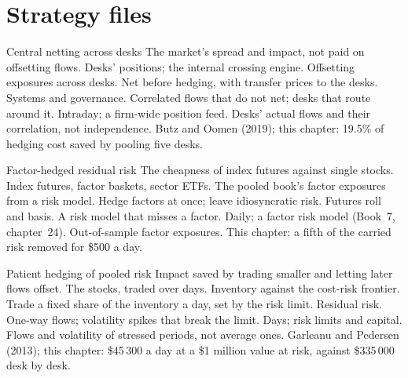 \section{Strategy files}

\begin{strategyfile}{Central netting across desks}\label{strat:s2:the-central-risk-book:netting}
 The market's spread and impact, not paid on offsetting flows.
 Desks' positions; the internal crossing engine.
 Offsetting exposures across desks.
 Net before hedging, with transfer prices to the desks.
 Systems and governance.
 Correlated flows that do not net; desks that route around it.
 Intraday; a firm-wide position feed.
 Desks' actual flows and their correlation, not independence.
 Butz and Oomen (2019); this chapter: 19.5\% of hedging cost saved by pooling five desks.
\end{strategyfile}

\begin{strategyfile}{Factor-hedged residual risk}\label{strat:s2:the-central-risk-book:factor}
 The cheapness of index futures against single stocks.
 Index futures, factor baskets, sector ETFs.
 The pooled book's factor exposures from a risk model.
 Hedge factors at once; leave idiosyncratic risk.
 Futures roll and basis.
 A risk model that misses a factor.
 Daily; a factor risk model (Book~7, chapter~24).
 Out-of-sample factor exposures.
 This chapter: a fifth of the carried risk removed for \$500 a day.
\end{strategyfile}

\begin{strategyfile}{Patient hedging of pooled risk}\label{strat:s2:the-central-risk-book:patient}
 Impact saved by trading smaller and letting later flows offset.
 The stocks, traded over days.
 Inventory against the cost-risk frontier.
 Trade a fixed share of the inventory a day, set by the risk limit.
 Residual risk.
 One-way flows; volatility spikes that break the limit.
 Days; risk limits and capital.
 Flows and volatility of stressed periods, not average ones.
 Garleanu and Pedersen (2013); this chapter: \$45\,300 a day at a \$1 million value at risk, against \$335\,000 desk by desk.
\end{strategyfile}

